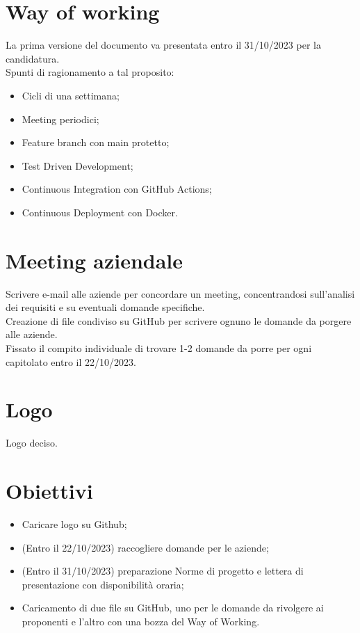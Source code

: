 \documentclass[12pt,a4paper]{article}
\begin{document}
\section{Way of working}
La prima versione del documento va presentata entro il 31/10/2023 per la candidatura.\\
Spunti di ragionamento a tal proposito:

\begin{itemize}
    \item Cicli di una settimana;    
    \item Meeting periodici;
    \item Feature branch con main protetto;
    \item Test Driven Development;
    \item Continuous Integration con GitHub Actions;
    \item Continuous Deployment con Docker.
\end{itemize}

\section{Meeting aziendale}

Scrivere e-mail alle aziende per concordare un meeting, concentrandosi sull'analisi dei requisiti e su eventuali domande specifiche.\\
Creazione di file condiviso su GitHub per scrivere ognuno le domande da porgere alle aziende.\\
Fissato il compito individuale di trovare 1-2 domande da porre per ogni capitolato entro il 22/10/2023.

\section{Logo}
Logo deciso.

\section{Obiettivi}
\begin{itemize}
    \item Caricare logo su Github;     
    \item (Entro il 22/10/2023) raccogliere domande per le aziende;
    \item (Entro il 31/10/2023) preparazione Norme di progetto e lettera di presentazione con disponibilità oraria;
    \item Caricamento di due file su GitHub, uno per le domande da rivolgere ai proponenti e l'altro con una bozza del Way of Working.
\end{itemize}
\end{document}

